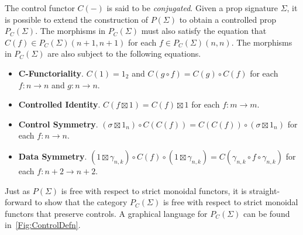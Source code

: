 The control functor $C( - )$ is said to be \emph{conjugated}.
Given a prop signature $\Sigma$, it is possible to extend the construction of $P( \Sigma )$ to obtain a controlled prop $P_C( \Sigma )$.
The morphisms in $P_C( \Sigma )$ must also satisfy the equation that $C( f ) \in P_C( \Sigma )( n + 1, n + 1 )$ for each $f \in P_C( \Sigma )( n, n )$.
The morphisms in $P_C( \Sigma )$ are also subject to the following equations.
\begin{itemize}
\item \textbf{C-Functoriality}.
      $C( 1 ) = 1_{2}$ and $C( g \circ f ) = C( g ) \circ C( f )$ for each $f: n \to n$ and $g: n \to n$.
\item \textbf{Controlled Identity}.
      $C( f \boxtimes 1 ) = C( f ) \boxtimes 1$ for each $f: m \to m$.
\item \textbf{Control Symmetry}.
      $( \sigma \boxtimes 1_n ) \circ C( C( f ) ) = C( C( f ) ) \circ ( \sigma \boxtimes 1_n )$ for each $f: n \to n$.
\item \textbf{Data Symmetry}.
      $( 1 \boxtimes \gamma_{n,k} ) \circ C( f ) \circ ( 1 \boxtimes \gamma_{n,k} ) = C( \gamma_{n,k} \circ f \circ \gamma_{n,k} )$ for each $f: n + 2 \to n + 2$.
\end{itemize}
Just as $P( \Sigma )$ is free with respect to strict monoidal functors, it is straight-forward to show that the category $P_C( \Sigma )$ is free with respect to strict monoidal functors that preserve controls.
A graphical language for $P_C( \Sigma )$ can be found in~\cref{Fig:ControlDefn}.

